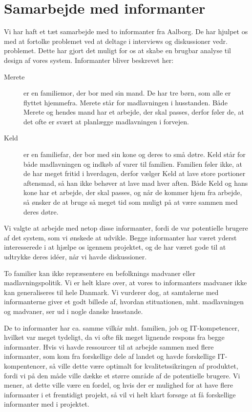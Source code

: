 \chapter{Samarbejde med informanter}
\label{akademiskinformanter}

Vi har haft et tæt samarbejde med to informanter fra Aalborg. De har hjulpet os med at fortolke problemet ved at deltage i interviews og diskussioner vedr. problemet. Dette har gjort det muligt for os at skabe en brugbar analyse til design af vores system. Informanter bliver beskrevet her:

\begin{description}
\item[Merete] er en familiemor, der bor med sin mand. De har tre børn, som alle er flyttet hjemmefra. Merete står for madlavningen i husstanden. Både Merete og hendes mand har et arbejde, der skal passes, derfor føler de, at det ofte er svært at planlægge madlavningen i forvejen.

\item[Keld] er en familiefar, der bor med sin kone og deres to små døtre. Keld står for både madlavningen og indkøb af varer til familien. Familien føler ikke, at de har meget fritid i hverdagen, derfor vælger Keld at lave store portioner aftensmad, så han ikke behøver at lave mad hver aften. Både Keld og hans kone har et arbejde, der skal passes, og når de kommer hjem fra arbejde, så ønsker de at bruge så meget tid som muligt på at være sammen med deres døtre.
\end{description}

Vi valgte at arbejde med netop disse informanter, fordi de var potentielle brugere af det system, som vi ønskede at udvikle. Begge informanter har været yderst interesserede i at hjælpe os igennem projektet, og de har været gode til at udtrykke deres idéer, når vi havde diskussioner.

To familier kan ikke repræsentere en befolknings madvaner eller madlavningspolitik. Vi er helt klare over, at vores to informanters madvaner ikke kan generaliseres til hele Danmark. Vi vurderer dog, at samtalerne med informanterne giver et godt billede af, hvordan stituationen, mht. madlavningen og madvaner, ser ud i nogle danske husstande. 

De to informanter har ca. samme vilkår mht. familien, job og IT-kompetencer, hvilket var meget tydeligt, da vi ofte fik meget lignende respons fra begge informanter. Hvis vi havde ressourcer til at arbejde sammen med flere informanter, som \fx kom fra forskellige dele af landet og havde forskellige IT-kompentencer, så ville dette være optimalt for kvalitetssikringen af produktet, fordi vi på den måde ville dække et større område af de potentielle brugere. Vi mener, at dette ville være en fordel, og hvis der er mulighed for at have flere informanter i et fremtidigt projekt, så vil vi helt klart forsøge at få forskellige informanter med i projektet.

